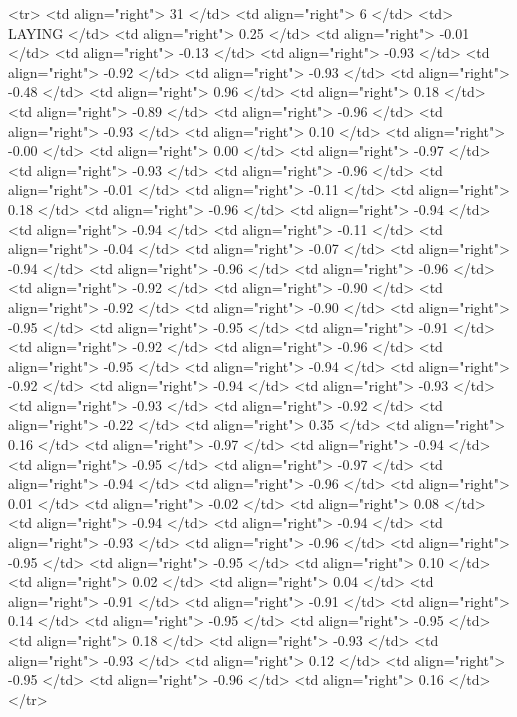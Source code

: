   <tr> <td align="right"> 31 </td> <td align="right">   6 </td> <td> LAYING </td> <td align="right"> 0.25 </td> <td align="right"> -0.01 </td> <td align="right"> -0.13 </td> <td align="right"> -0.93 </td> <td align="right"> -0.92 </td> <td align="right"> -0.93 </td> <td align="right"> -0.48 </td> <td align="right"> 0.96 </td> <td align="right"> 0.18 </td> <td align="right"> -0.89 </td> <td align="right"> -0.96 </td> <td align="right"> -0.93 </td> <td align="right"> 0.10 </td> <td align="right"> -0.00 </td> <td align="right"> 0.00 </td> <td align="right"> -0.97 </td> <td align="right"> -0.93 </td> <td align="right"> -0.96 </td> <td align="right"> -0.01 </td> <td align="right"> -0.11 </td> <td align="right"> 0.18 </td> <td align="right"> -0.96 </td> <td align="right"> -0.94 </td> <td align="right"> -0.94 </td> <td align="right"> -0.11 </td> <td align="right"> -0.04 </td> <td align="right"> -0.07 </td> <td align="right"> -0.94 </td> <td align="right"> -0.96 </td> <td align="right"> -0.96 </td> <td align="right"> -0.92 </td> <td align="right"> -0.90 </td> <td align="right"> -0.92 </td> <td align="right"> -0.90 </td> <td align="right"> -0.95 </td> <td align="right"> -0.95 </td> <td align="right"> -0.91 </td> <td align="right"> -0.92 </td> <td align="right"> -0.96 </td> <td align="right"> -0.95 </td> <td align="right"> -0.94 </td> <td align="right"> -0.92 </td> <td align="right"> -0.94 </td> <td align="right"> -0.93 </td> <td align="right"> -0.93 </td> <td align="right"> -0.92 </td> <td align="right"> -0.22 </td> <td align="right"> 0.35 </td> <td align="right"> 0.16 </td> <td align="right"> -0.97 </td> <td align="right"> -0.94 </td> <td align="right"> -0.95 </td> <td align="right"> -0.97 </td> <td align="right"> -0.94 </td> <td align="right"> -0.96 </td> <td align="right"> 0.01 </td> <td align="right"> -0.02 </td> <td align="right"> 0.08 </td> <td align="right"> -0.94 </td> <td align="right"> -0.94 </td> <td align="right"> -0.93 </td> <td align="right"> -0.96 </td> <td align="right"> -0.95 </td> <td align="right"> -0.95 </td> <td align="right"> 0.10 </td> <td align="right"> 0.02 </td> <td align="right"> 0.04 </td> <td align="right"> -0.91 </td> <td align="right"> -0.91 </td> <td align="right"> 0.14 </td> <td align="right"> -0.95 </td> <td align="right"> -0.95 </td> <td align="right"> 0.18 </td> <td align="right"> -0.93 </td> <td align="right"> -0.93 </td> <td align="right"> 0.12 </td> <td align="right"> -0.95 </td> <td align="right"> -0.96 </td> <td align="right"> 0.16 </td> </tr>
